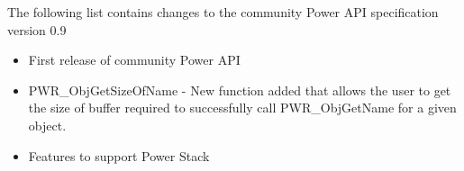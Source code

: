 The following list contains changes to the community Power API specification version 0.9

\begin{itemize}
  \item{First release of community Power API}
  \item{PWR_ObjGetSizeOfName - New function added that allows the user to get the size of buffer required to successfully call PWR_ObjGetName for a given object.}
  \item{Features to support Power Stack}
\end{itemize}



